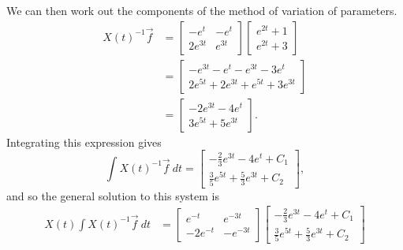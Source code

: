 \documentclass{ximera}
\begin{document}
\begin{exampleSol}
\begin{enumerate}
            We can then work out the components of the method of variation of parameters.
            \begin{equation*}
                \begin{split}
                    X(t)^{-1}\vec{f} &= \begin{bmatrix} -e^{t} & -e^{t} \\ 2e^{3t} & e^{3t} \end{bmatrix}  \begin{bmatrix} e^{2t} + 1 \\ e^{2t} + 3 \end{bmatrix} \\
                    &= \begin{bmatrix} -e^{3t} - e^{t} - e^{3t} - 3e^{t} \\ 2e^{5t} + 2e^{3t} + e^{5t} + 3e^{3t} \end{bmatrix} \\
                    &= \begin{bmatrix} -2e^{3t} - 4e^{t} \\ 3e^{5t} + 5e^{3t} \end{bmatrix}.
                \end{split}
            \end{equation*}
            Integrating this expression gives
            \begin{equation*}
                \int X(t)^{-1}\vec{f}\ dt = \begin{bmatrix} -\frac{2}{3}e^{3t} - 4e^t + C_1 \\ \frac{3}{5}e^{5t} + \frac{5}{3}e^{3t} + C_2 \end{bmatrix},
            \end{equation*}
            and so the general solution to this system is
            \begin{equation}\label{eq:AllExVP}
                \begin{split}
                    X(t) \int X(t)^{-1}\vec{f}\ dt &= 
                    \begin{bmatrix} 
                        e^{-t} & e^{-3t} \\ 
                        -2e^{-t} & -e^{-3t} 
                    \end{bmatrix}
                    \begin{bmatrix} 
                        -\frac{2}{3}e^{3t} - 4e^t + C_1 \\ 
                        \frac{3}{5}e^{5t} + \frac{5}{3}e^{3t} + C_2 
                    \end{bmatrix} \\

\end{split}
\end{equation}
\end{enumerate}
\end{exampleSol}
\end{document}
